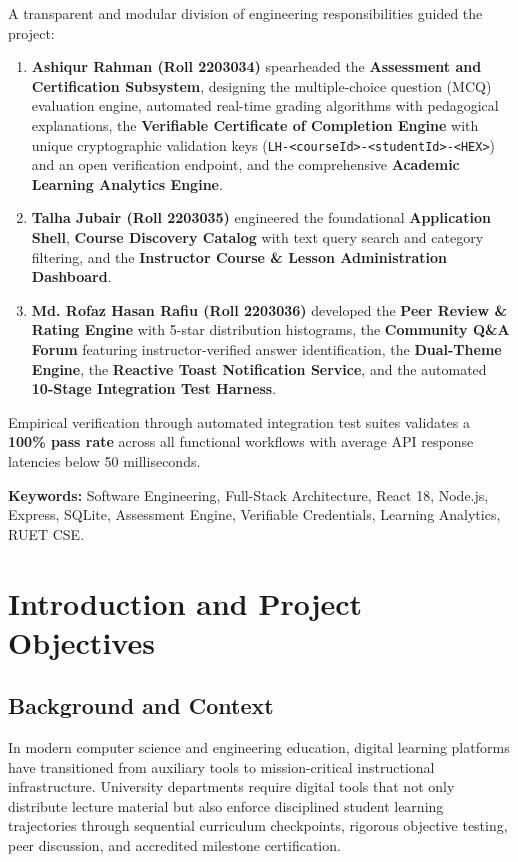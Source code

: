 \documentclass[12pt,a4paper]{report}
\begin{document}
A transparent and modular division of engineering responsibilities guided the project:
\begin{enumerate}[itemsep=4pt]
    \item \textbf{Ashiqur Rahman (Roll 2203034)} spearheaded the \textbf{Assessment and Certification Subsystem}, designing the multiple-choice question (MCQ) evaluation engine, automated real-time grading algorithms with pedagogical explanations, the \textbf{Verifiable Certificate of Completion Engine} with unique cryptographic validation keys (\texttt{LH-<courseId>-<studentId>-<HEX>}) and an open verification endpoint, and the comprehensive \textbf{Academic Learning Analytics Engine}.
    \item \textbf{Talha Jubair (Roll 2203035)} engineered the foundational \textbf{Application Shell}, \textbf{Course Discovery Catalog} with text query search and category filtering, and the \textbf{Instructor Course \& Lesson Administration Dashboard}.
    \item \textbf{Md. Rofaz Hasan Rafiu (Roll 2203036)} developed the \textbf{Peer Review \& Rating Engine} with 5-star distribution histograms, the \textbf{Community Q\&A Forum} featuring instructor-verified answer identification, the \textbf{Dual-Theme Engine}, the \textbf{Reactive Toast Notification Service}, and the automated \textbf{10-Stage Integration Test Harness}.
\end{enumerate}

Empirical verification through automated integration test suites validates a \textbf{100\% pass rate} across all functional workflows with average API response latencies below 50 milliseconds.

\vspace{0.8cm}
\noindent \textbf{Keywords:} Software Engineering, Full-Stack Architecture, React 18, Node.js, Express, SQLite, Assessment Engine, Verifiable Credentials, Learning Analytics, RUET CSE.

\newpage
\tableofcontents
\newpage
\listoffigures
\listoftables
\newpage

\chapter{Introduction and Project Objectives}

\section{Background and Context}
In modern computer science and engineering education, digital learning platforms have transitioned from auxiliary tools to mission-critical instructional infrastructure. University departments require digital tools that not only distribute lecture material but also enforce disciplined student learning trajectories through sequential curriculum checkpoints, rigorous objective testing, peer discussion, and accredited milestone certification.
\end{document}
